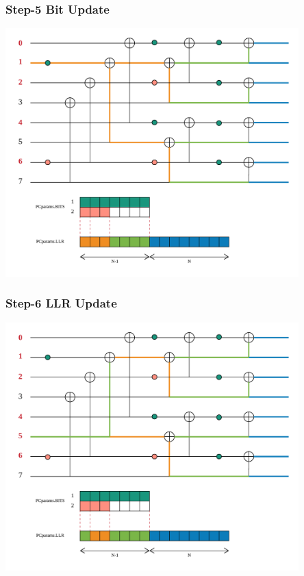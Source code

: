 \documentclass{beamer}
\begin{document}
\begin{frame}
\frametitle{Step-5 Bit Update}
  \begin{center}
  \includegraphics[width=0.85\textwidth]{pics/polar_-_SC_bit_5.png}
  \end{center}
\end{frame}

\begin{frame}
\frametitle{Step-6 LLR Update}
  \begin{center}
  \includegraphics[width=0.85\textwidth]{pics/polar_-_SC_llr_6.png}
  \end{center}
\end{frame}
\end{document}
